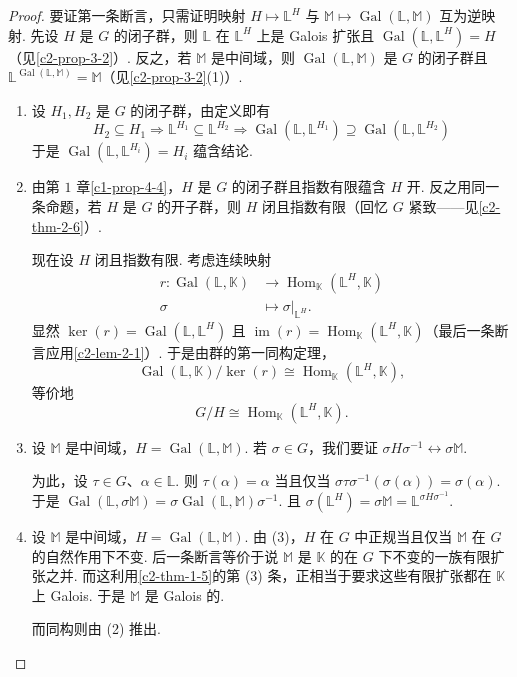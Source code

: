 \begin{proof}
要证第一条断言，只需证明映射 $H\mapsto\mathbb{L}^{H}$ 与 $\mathbb{M}\mapsto\operatorname{Gal}(\mathbb{L},\mathbb{M})$ 互为逆映射. 先设 $H$ 是 $G$ 的闭子群，则 $\mathbb{L}$ 在 $\mathbb{L}^{H}$ 上是 Galois 扩张且 $\operatorname{Gal}(\mathbb{L},\mathbb{L}^{H})=H$（见\autoref{c2-prop-3-2}）. 反之，若 $\mathbb{M}$ 是中间域，则 $\operatorname{Gal}(\mathbb{L},\mathbb{M})$ 是 $G$ 的闭子群且 $\mathbb{L}^{\operatorname{Gal}(\mathbb{L},\mathbb{M})}=\mathbb{M}$（见\autoref{c2-prop-3-2}(1)）.
\begin{enumerate}
    \item 设 $H_{1},H_{2}$ 是 $G$ 的闭子群，由定义即有
    \[
    H_{2}\subseteq H_{1}\Rightarrow\mathbb{L}^{H_{1}}\subseteq\mathbb{L}^{H_{2}}\Rightarrow\operatorname{Gal}(\mathbb{L},\mathbb{L}^{H_{1}})\supseteq\operatorname{Gal}(\mathbb{L},\mathbb{L}^{H_{2}})
    \]
    于是 $\operatorname{Gal}(\mathbb{L},\mathbb{L}^{H_{i}})=H_{i}$ 蕴含结论.
    \item 由第 $1$ 章\autoref{c1-prop-4-4}，$H$ 是 $G$ 的闭子群且指数有限蕴含 $H$ 开. 反之用同一条命题，若 $H$ 是 $G$ 的开子群，则 $H$ 闭且指数有限（回忆 $G$ 紧致——见\autoref{c2-thm-2-6}）.

    现在设 $H$ 闭且指数有限. 考虑连续映射
    \[
    \begin{aligned}
    r:\operatorname{Gal}(\mathbb{L},\mathbb{K})&\longrightarrow\operatorname{Hom}_{\mathbb{K}}(\mathbb{L}^{H},\mathbb{K})\\
    \sigma&\longmapsto\sigma|_{\mathbb{L}^{H}}.
    \end{aligned}
    \]
    显然 $\ker(r)=\operatorname{Gal}(\mathbb{L},\mathbb{L}^{H})$ 且 $\operatorname{im}(r)=\operatorname{Hom}_{\mathbb{K}}(\mathbb{L}^{H},\mathbb{K})$（最后一条断言应用\autoref{c2-lem-2-1}）. 于是由群的第一同构定理，
    \[
    \operatorname{Gal}(\mathbb{L},\mathbb{K})/\ker(r)\cong\operatorname{Hom}_{\mathbb{K}}(\mathbb{L}^{H},\mathbb{K}),
    \]
    等价地
    \[
    G/H\cong\operatorname{Hom}_{\mathbb{K}}(\mathbb{L}^{H},\mathbb{K}).
    \]
    \item 设 $\mathbb{M}$ 是中间域，$H=\operatorname{Gal}(\mathbb{L},\mathbb{M})$. 若 $\sigma\in G$，我们要证 $\sigma H\sigma^{-1}\leftrightarrow\sigma\mathbb{M}$.

    为此，设 $\tau\in G$、$\alpha\in\mathbb{L}$. 则 $\tau(\alpha)=\alpha$ 当且仅当 $\sigma\tau\sigma^{-1}(\sigma(\alpha))=\sigma(\alpha)$. 于是 $\operatorname{Gal}(\mathbb{L},\sigma\mathbb{M})=\sigma\operatorname{Gal}(\mathbb{L},\mathbb{M})\sigma^{-1}$. 且 $\sigma(\mathbb{L}^{H})=\sigma\mathbb{M}=\mathbb{L}^{\sigma H\sigma^{-1}}$.
    \item 设 $\mathbb{M}$ 是中间域，$H=\operatorname{Gal}(\mathbb{L},\mathbb{M})$. 由 (3)，$H$ 在 $G$ 中正规当且仅当 $\mathbb{M}$ 在 $G$ 的自然作用下不变. 后一条断言等价于说 $\mathbb{M}$ 是 $\mathbb{K}$ 的在 $G$ 下不变的一族有限扩张之并. 而这利用\autoref{c2-thm-1-5}的第 (3) 条，正相当于要求这些有限扩张都在 $\mathbb{K}$ 上 Galois. 于是 $\mathbb{M}$ 是 Galois 的.

    而同构则由 (2) 推出.
\end{enumerate}
\end{proof}

